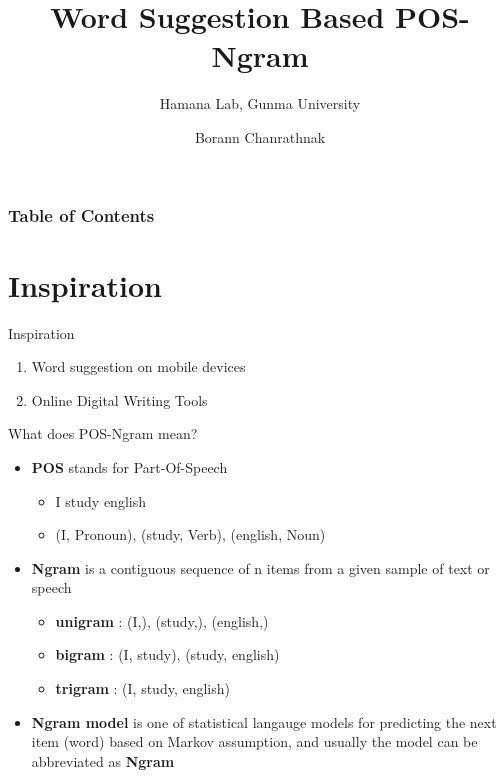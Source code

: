 \documentclass{beamer}
\title{Word Suggestion Based POS-Ngram}
\subtitle{Hamana Lab, Gunma University}
\author{Borann Chanrathnak}
\begin{document}
\maketitle


\begin{frame}
\frametitle{Table of Contents}
\tableofcontents
\end{frame}

\section{Inspiration}

\begin{frame}{Inspiration}
\begin{enumerate}
    \item Word suggestion on mobile devices
    \item Online Digital Writing Tools
\end{enumerate}

\end{frame}


\begin{frame}{What does POS-Ngram mean?}
\begin{itemize}
    \item \textbf{POS} stands for Part-Of-Speech
        \begin{itemize}
            \item I study english
            \item (I, Pronoun), (study, Verb), (english, Noun)
        \end{itemize}
    \item \textbf{Ngram} is a contiguous sequence of n items from a given sample of text or speech
        \begin{itemize}
            \item \textbf{unigram} : (I,), (study,), (english,)
            \item \textbf{bigram} : (I, study), (study, english) 
            \item \textbf{trigram} : (I, study, english)
        \end{itemize}
    \item \textbf{Ngram model} is one of statistical langauge models for predicting the next item (word) based on Markov assumption, and usually the model can be abbreviated as \textbf{Ngram}
\end{itemize}
\end{frame}
\end{document}
